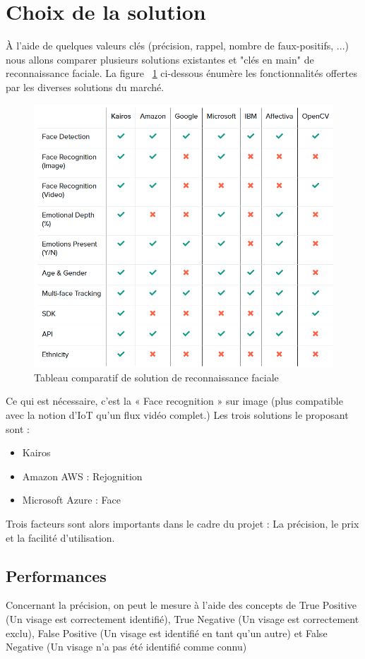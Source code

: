 \section{Choix de la solution}

À l'aide de quelques valeurs clés (précision, rappel, nombre de faux-positifs, ...) nous allons comparer plusieurs solutions existantes et "clés en main" de reconnaissance faciale.
La figure ~\ref{fig:tab-comparatif-reco} ci-dessous énumère les fonctionnalités offertes par les diverses solutions du marché.

\begin{figure}[H]
	\centering
	\includegraphics[width=12cm]{images/proto-4.png}
	\caption{Tableau comparatif de solution de reconnaissance faciale}
	\label{fig:tab-comparatif-reco}
\end{figure}

Ce qui est nécessaire, c’est la « Face recognition » sur image (plus compatible avec la notion d’IoT qu’un flux vidéo
complet.) Les trois solutions le proposant sont :

\begin{itemize}
\item Kairos
\item Amazon AWS : Rejognition
\item Microsoft Azure : Face
\end{itemize}

Trois facteurs sont alors importants dans le cadre du projet : La précision, le prix et la facilité d’utilisation.

\subsection{Performances}
Concernant la précision, on peut le mesure à l’aide des concepts de True Positive (Un visage est correctement
identifié), True Negative (Un visage est correctement exclu), False Positive (Un visage est identifié en tant qu’un
autre) et False Negative (Un visage n’a pas été identifié comme connu)

